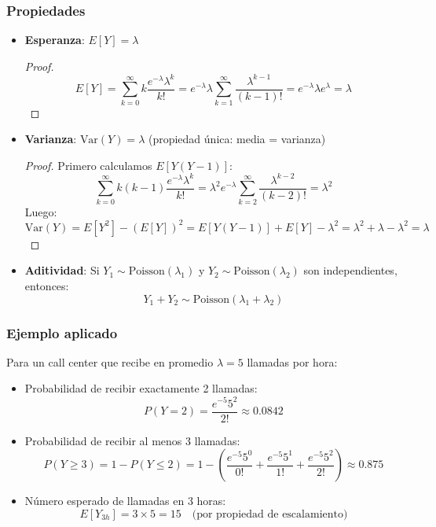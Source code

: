 \documentclass[letterpaper, 12pt]{article}
\begin{document}
	\subsubsection*{Propiedades}
	\begin{itemize}
		\item \textbf{Esperanza}: $E[Y] = \lambda$
		\begin{proof}
			\[
			E[Y] = \sum_{k=0}^\infty k \frac{e^{-\lambda} \lambda^k}{k!} = e^{-\lambda} \lambda \sum_{k=1}^\infty \frac{\lambda^{k-1}}{(k-1)!} = e^{-\lambda} \lambda e^{\lambda} = \lambda
			\]
		\end{proof}
		
		\item \textbf{Varianza}: $\text{Var}(Y) = \lambda$ (propiedad única: media = varianza)
		\begin{proof}
			Primero calculamos $E[Y(Y-1)]$:
			\[
			\sum_{k=0}^\infty k(k-1) \frac{e^{-\lambda} \lambda^k}{k!} = \lambda^2 e^{-\lambda} \sum_{k=2}^\infty \frac{\lambda^{k-2}}{(k-2)!} = \lambda^2
			\]
			Luego:
			\[
			\text{Var}(Y) = E[Y^2] - (E[Y])^2 = E[Y(Y-1)] + E[Y] - \lambda^2 = \lambda^2 + \lambda - \lambda^2 = \lambda
			\]
		\end{proof}
		
		\item \textbf{Aditividad}: Si $Y_1 \sim \text{Poisson}(\lambda_1)$ y $Y_2 \sim \text{Poisson}(\lambda_2)$ son independientes, entonces:
		\[
		Y_1 + Y_2 \sim \text{Poisson}(\lambda_1 + \lambda_2)
		\]
	\end{itemize}
	
	\subsubsection*{Ejemplo aplicado}
	Para un call center que recibe en promedio $\lambda = 5$ llamadas por hora:
	\begin{itemize}
		\item Probabilidad de recibir exactamente 2 llamadas:
		\[
		P(Y=2) = \frac{e^{-5} 5^2}{2!} \approx 0.0842
		\]
		
		\item Probabilidad de recibir al menos 3 llamadas:
		\[
		P(Y \geq 3) = 1 - P(Y \leq 2) = 1 - \left(\frac{e^{-5}5^0}{0!} + \frac{e^{-5}5^1}{1!} + \frac{e^{-5}5^2}{2!}\right) \approx 0.875
		\]
		
		\item Número esperado de llamadas en 3 horas:
		\[
		E[Y_{3h}] = 3 \times 5 = 15 \quad \text{(por propiedad de escalamiento)}
		\]
	\end{itemize}
	
\end{document}
